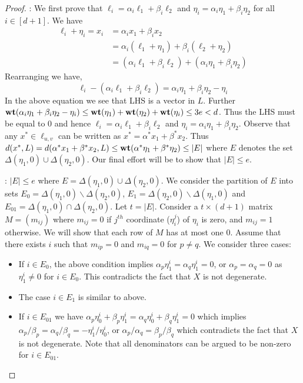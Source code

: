 \begin{proof}
: We first prove
that $\ell_i=\alpha_i\ell_1+\beta_i\ell_2$ and
$\eta_i=\alpha_i\eta_1+\beta_i\eta_2$ for
all $i\in [d+1]$. We have
\begin{align*}
\ell_i+\eta_i = x_i &= \alpha_ix_1 + \beta_ix_2 \\
    &= \alpha_i(\ell_1+\eta_1) + \beta_i(\ell_2 + \eta_2) \\
    &= (\alpha_i\ell_1 + \beta_i\ell_2) + (\alpha_i\eta_1 + \beta_i\eta_2)
\end{align*}
Rearranging we have,
\begin{equation*}
\ell_i - (\alpha_i\ell_1 + \beta_i\ell_2) = \alpha_i\eta_1 +
\beta_i\eta_2 - \eta_i
\end{equation*}
In the above equation we see that LHS is a vector in $L$. Further
$\mathbf{wt}({\alpha_i\eta_1 + \beta_i\eta_2 - \eta_i})\leq
\mathbf{wt}({\eta_1})+\mathbf{wt}({\eta_2})+\mathbf{wt}({\eta_i})\leq 3e < d$. Thus the LHS must be equal to
$0$ and hence $\ell_i = \alpha_i\ell_1 + \beta_i\ell_2$ and
$\eta_i=\alpha_i\eta_1+\beta_i\eta_2$. Observe that any $x^\ast\in \ell_{u,v}$ can
be written as $x^\ast=\alpha^\ast x_1+\beta^\ast x_2$. Thus
$d(x^\ast,L)=d(\alpha^\ast x_1+\beta^\ast x_2,L)\leq \mathbf{wt}({\alpha^\ast
\eta_1+\beta^\ast \eta_2})\leq |E|$ where $E$ denotes the set
$\Delta(\eta_1,0)\cup \Delta(\eta_2,0)$. Our final effort will be to show that
$|E|\leq e$.

: $|E|\leq e$ where $E = \Delta(\eta_1,0)\cup
\Delta(\eta_2,0)$. We consider the partition of $E$ into sets
$E_0=\Delta(\eta_1,0)\backslash \Delta(\eta_2,0)$,
$E_1=\Delta(\eta_2,0)\backslash \Delta(\eta_1,0)$ and
$E_{01}=\Delta(\eta_1,0)\cap \Delta(\eta_2,0)$. Let $t=|E|$. Consider a $t\times (d+1)$ matrix $M=(m_{ij})$
where $m_{ij}=0$ if $j^{th}$ coordinate ($\eta_i^j$) of $\eta_i$ is zero, and $m_{ij}=1$
otherwise. We will show that each row of $M$ has at most one $0$. Assume that
there exists $i$ such that $m_{ip}=0$ and $m_{iq}=0$ for $p\neq q$. We consider
three cases:
\begin{itemize}
\item If $i\in E_0$, the above condition implies $\alpha_p\eta_1^i =
\alpha_q\eta_1^i=0$, or $\alpha_p=\alpha_q=0$ as $\eta_1^i\neq 0$ for $i\in E_0$.
This contradicts the fact that $X$ is not degenerate.
\item The case $i\in E_1$ is similar to above.
\item If $i\in E_{01}$ we have
$\alpha_p\eta_0^i+\beta_p\eta_1^i=\alpha_q\eta_0^i+\beta_q\eta_1^i=0$ which
implies $\alpha_p/\beta_p=\alpha_q/\beta_q=-\eta_1^i/\eta_0^i$, or
$\alpha_p/\alpha_q = \beta_p/\beta_q$ which contradicts the fact that $X$ is
not degenerate. Note that all denominators can be argued to be non-zero for $i\in E_{01}$. 
\end{itemize}


\end{proof}
